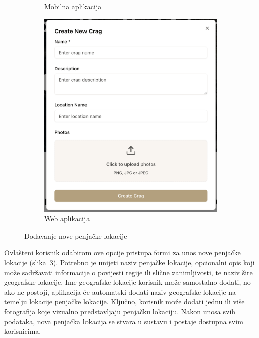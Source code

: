 \begin{figure}[H]
\begin{subfigure}[b]{0.31\textwidth}
        \caption{Mobilna aplikacija}
        \label{fig:dodavanje_lokacije_mob}
    \end{subfigure}
    \hfill
    \begin{subfigure}[b]{0.6\textwidth}
        \centering
        \includegraphics[width=\textwidth]{images/implementacija/web/editing-options/create-crag.png}
        \caption{Web aplikacija}
        \label{fig:dodavanje_lokacije_web}
    \end{subfigure}
    \caption{Dodavanje nove penjačke lokacije}
    \label{fig:dodavanje_lokacije}
\end{figure}

Ovlašteni korisnik odabirom ove opcije pristupa formi za unos nove penjačke lokacije (slika~\ref{fig:dodavanje_lokacije}). Potrebno je unijeti naziv penjačke lokacije, opcionalni opis koji može sadržavati informacije o povijesti regije ili slične zanimljivosti, te naziv šire geografske lokacije. Ime geografske lokacije korisnik može samostalno dodati, no ako ne postoji, aplikacija će automatski dodati naziv geografske lokacije na temelju lokacije penjačke lokacije. Ključno, korisnik može dodati jednu ili više fotografija koje vizualno predstavljaju penjačku lokaciju. Nakon unosa svih podataka, nova penjačka lokacija se stvara u sustavu i postaje dostupna svim korisnicima.

